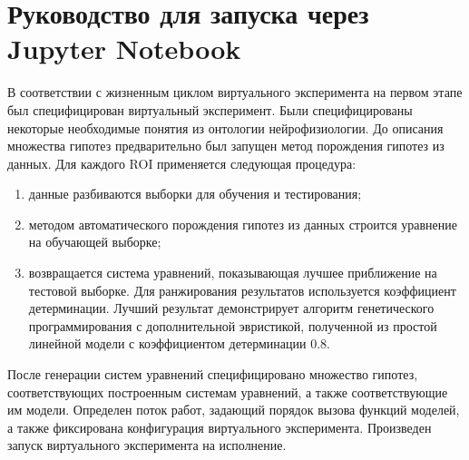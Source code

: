 \section{Руководство для запуска через Jupyter Notebook}\label{sect5_0}
В соответствии с жизненным циклом виртуального эксперимента на первом этапе был специфицирован виртуальный 
эксперимент. Были специфицированы некоторые необходимые понятия из онтологии нейрофизиологии. До описания множества 
гипотез предварительно был запущен метод порождения гипотез из данных. 
Для каждого ROI применяется следующая процедура:
\begin{enumerate}
     \item данные разбиваются выборки для обучения и тестирования; 
     \item методом автоматического порождения гипотез из данных строится уравнение на обучающей выборке; 
     \item возвращается система уравнений, показывающая лучшее приближение на тестовой выборке. 
            Для ранжирования результатов используется коэффициент детерминации. Лучший результат демонстрирует 
            алгоритм генетического программирования с дополнительной эвристикой, 
            полученной из простой линейной модели с коэффициентом детерминации 0.8.
\end{enumerate}

После генерации систем уравнений специфицировано множество гипотез, соответствующих построенным системам уравнений, 
а также соответствующие им модели. Определен поток работ, задающий порядок вызова функций моделей, а также 
фиксирована конфигурация виртуального эксперимента. Произведен запуск виртуального эксперимента на исполнение.

